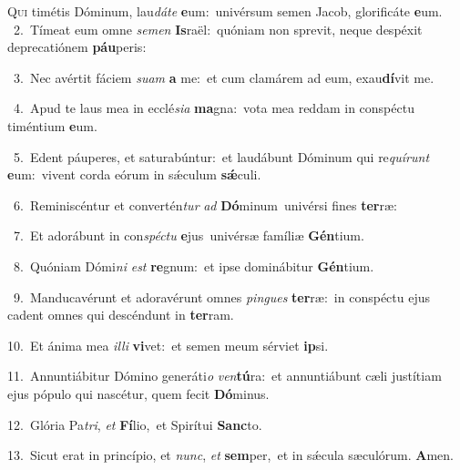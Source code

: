 \lettrine{\initial\textcolor{\initialcolor}{Q}}{ui} timétis Dóminum, lau\-\textit{dá}\-\textit{te} \textbf{e}\-um:~\star univérsum semen Jacob, glorificáte \textbf{e}\-um.\\
{\numbfont\textcolor{\numbcolor}{~2.}}~Tímeat eum omne \textit{se}\-\textit{men} \textbf{Is}\-raël:~\star quóniam non sprevit, neque despéxit deprecatiónem \textbf{páu}\-peris:\par
{\numbfont\textcolor{\numbcolor}{~3.}}~Nec avértit fáciem \textit{su}\-\textit{am} \textbf{a} me:~\star et cum clamárem ad eum, exau\-\textbf{dí}\-vit me.\par
{\numbfont\textcolor{\numbcolor}{~4.}}~Apud te laus mea in ecclé\-\textit{si}\-\textit{a} \textbf{ma}\-gna:~\star vota mea reddam in conspéctu timéntium \textbf{e}\-um.\par
{\numbfont\textcolor{\numbcolor}{~5.}}~Edent páuperes, et saturabúntur:~\dagger et laudábunt Dóminum qui re\-\textit{quí}\-\textit{runt} \textbf{e}\-um:~\star vivent corda eórum in sǽculum \textbf{sǽ}\-culi.\par
{\numbfont\textcolor{\numbcolor}{~6.}}~Reminiscéntur et convertén\textit{tur} \textit{ad} \textbf{Dó}\-minum~\star univérsi fines \textbf{ter}\-ræ:\par
{\numbfont\textcolor{\numbcolor}{~7.}}~Et adorábunt in con\-\textit{spéc}\-\textit{tu} \textbf{e}\-jus~\star univérsæ famíliæ \textbf{Gén}\-tium.\par
{\numbfont\textcolor{\numbcolor}{~8.}}~Quóniam Dómi\textit{ni} \textit{est} \textbf{re}\-gnum:~\star et ipse dominábitur \textbf{Gén}\-tium.\par
{\numbfont\textcolor{\numbcolor}{~9.}}~Manducavérunt et adoravérunt omnes \textit{pin}\-\textit{gues} \textbf{ter}\-ræ:~\star in conspéctu ejus cadent omnes qui descéndunt in \textbf{ter}\-ram.\par
{\numbfont\textcolor{\numbcolor}{10.}}~Et ánima mea \textit{il}\-\textit{li} \textbf{vi}\-vet:~\star et semen meum sérviet \textbf{ip}\-si.\par
{\numbfont\textcolor{\numbcolor}{11.}}~Annuntiábitur Dómino generáti\textit{o} \textit{ven}\-\textbf{tú}ra:~\star et annuntiábunt cæli justítiam ejus pópulo qui nascétur, quem fecit \textbf{Dó}\-minus.\par
{\numbfont\textcolor{\numbcolor}{12.}}~Glória Pa\-\textit{tri}\-, \textit{et} \textbf{Fí}\-lio,~\star et Spirítui \textbf{Sanc}\-to.\par
{\numbfont\textcolor{\numbcolor}{13.}}~Sicut erat in princípio, et \textit{nunc}\-, \textit{et} \textbf{sem}\-per,~\star et in sǽcula sæculórum. \textbf{A}\-men.\par
